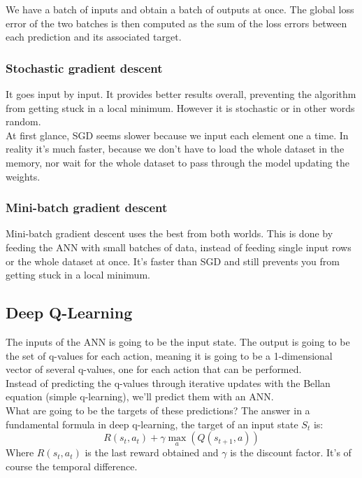\documentclass[french]{article}
\begin{document}
We have a batch of inputs and obtain a batch of outputs at once. The global loss error of the two batches is then computed as the sum of the loss errors between each prediction and its associated target.

\subsubsection{Stochastic gradient descent}

It goes input by input.
It provides better results overall, preventing the algorithm from getting stuck in a local minimum. However it is stochastic or in other words random. \\
At first glance, SGD seems slower because we input each element one a time. In reality it's much faster, because we don't have to load the whole dataset in the memory, nor wait for the whole dataset to pass through the model updating the weights.

\subsubsection{Mini-batch gradient descent}

Mini-batch gradient descent uses the best from both worlds. This is done by feeding the ANN with small batches of data, instead of feeding single input rows or the whole dataset at once. It's faster than SGD and still prevents you from getting stuck in a local minimum.

\subsection{Deep Q-Learning}

The inputs of the ANN is going to be the input state. The output is going to be the set of q-values for each action, meaning it is going to be a 1-dimensional vector of several q-values, one for each action that can be performed. \\
Instead of predicting the q-values through iterative updates with the Bellan equation (simple q-learning), we'll predict them with an ANN. \\
What are going to be the targets of these predictions? The answer in a fundamental formula in deep q-learning, the target of an input state $S_t$ is:
\[R(s_t, a_t) + \gamma \max_a(Q(s_{t+1}, a))\]
Where $R(s_t, a_t)$ is the last reward obtained and $\gamma$ is the discount factor. It's of course the temporal difference.
\end{document}
